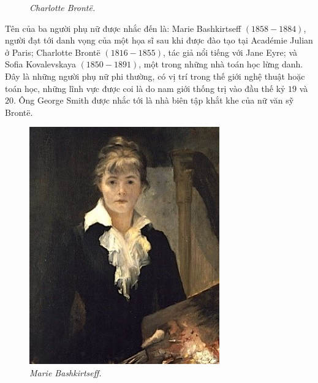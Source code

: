 \begin{multicols}{2}
\begin{figure}[H]
		\caption{\small\textit{\color{lichsutoanhoc}Charlotte Brontë.}}
		\vspace*{-10pt}
	\end{figure}
	Tên của ba người phụ nữ được nhắc đến là: Marie Bashkirtseff $(1858-1884)$, người đạt tới danh vọng của một họa sĩ sau khi được đào tạo tại Académie Julian ở Paris; Charlotte Brontë $(1816-1855)$, tác giả nổi tiếng với Jane Eyre; và Sofia Kovalevskaya $(1850-1891)$, một trong những nhà toán học lừng danh. Đây là những người phụ nữ phi thường, có vị trí trong thế giới nghệ thuật hoặc toán học, những lĩnh vực được coi là do nam giới thống trị vào đầu thế kỷ $19$ và $20$. Ông George Smith được nhắc tới là nhà biên tập khắt khe của nữ văn sỹ Brontë.
	\begin{figure}[H]
		\vspace*{-5pt}
		\centering
		\captionsetup{labelformat= empty, justification=centering}
		\includegraphics[width= 0.75\linewidth]{3}
		\caption{\small\textit{\color{lichsutoanhoc}Marie Bashkirtseff.}}
		\vspace*{-10pt}
	\end{figure}

\end{multicols}
